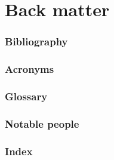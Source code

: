 \part{Back matter}

\renewcommand{\thesection}{\Roman{section}.}

\section{Bibliography}


\section{Acronyms}


\section{Glossary}


\section{Notable people}


\section{Index}


